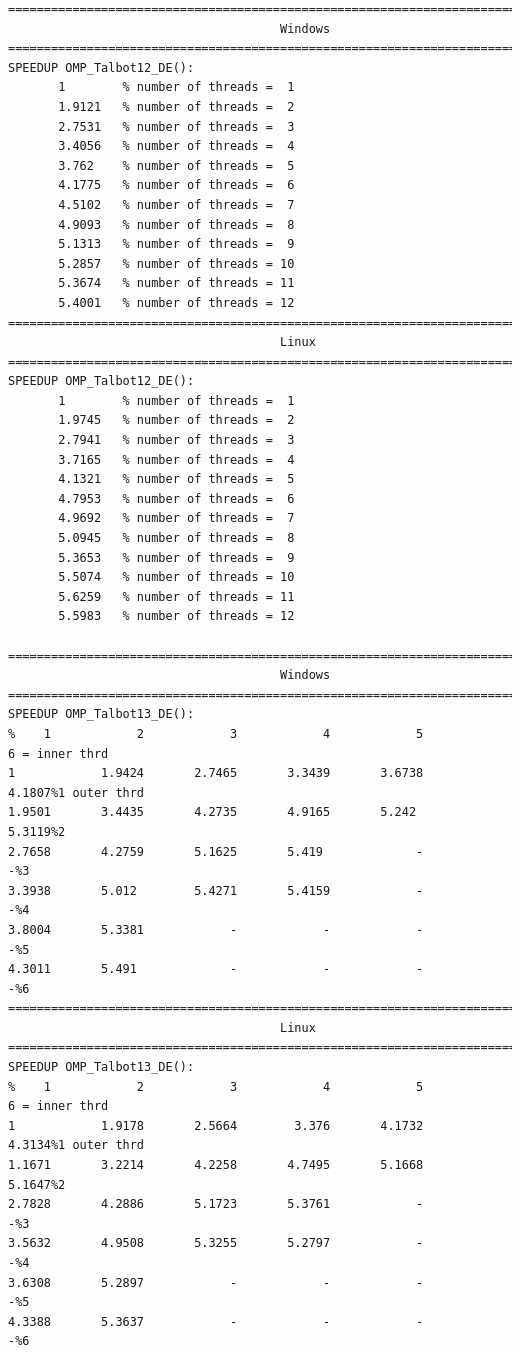 \documentclass[a4paper,10pt]{report}%
\begin{document}
\begin{lstlisting}
====================================================================================
                                      Windows
====================================================================================
SPEEDUP OMP_Talbot12_DE():
       1        % number of threads =  1
       1.9121   % number of threads =  2
       2.7531   % number of threads =  3
       3.4056   % number of threads =  4
       3.762    % number of threads =  5
       4.1775   % number of threads =  6
       4.5102   % number of threads =  7
       4.9093   % number of threads =  8
       5.1313   % number of threads =  9
       5.2857   % number of threads = 10
       5.3674   % number of threads = 11
       5.4001   % number of threads = 12
====================================================================================
                                      Linux
====================================================================================
SPEEDUP OMP_Talbot12_DE():
       1        % number of threads =  1
       1.9745   % number of threads =  2
       2.7941   % number of threads =  3
       3.7165   % number of threads =  4
       4.1321   % number of threads =  5
       4.7953   % number of threads =  6
       4.9692   % number of threads =  7
       5.0945   % number of threads =  8
       5.3653   % number of threads =  9
       5.5074   % number of threads = 10
       5.6259   % number of threads = 11
       5.5983   % number of threads = 12

====================================================================================
                                      Windows
====================================================================================
SPEEDUP OMP_Talbot13_DE():
%    1            2            3            4            5            6 = inner thrd
1            1.9424       2.7465       3.3439       3.6738       4.1807%1 outer thrd
1.9501       3.4435       4.2735       4.9165       5.242        5.3119%2
2.7658       4.2759       5.1625       5.419             -            -%3
3.3938       5.012        5.4271       5.4159            -            -%4
3.8004       5.3381            -            -            -            -%5
4.3011       5.491             -            -            -            -%6
====================================================================================
                                      Linux
====================================================================================
SPEEDUP OMP_Talbot13_DE():
%    1            2            3            4            5            6 = inner thrd
1            1.9178       2.5664        3.376       4.1732       4.3134%1 outer thrd
1.1671       3.2214       4.2258       4.7495       5.1668       5.1647%2
2.7828       4.2886       5.1723       5.3761            -            -%3
3.5632       4.9508       5.3255       5.2797            -            -%4
3.6308       5.2897            -            -            -            -%5
4.3388       5.3637            -            -            -            -%6
\end{lstlisting}
\end{document}
